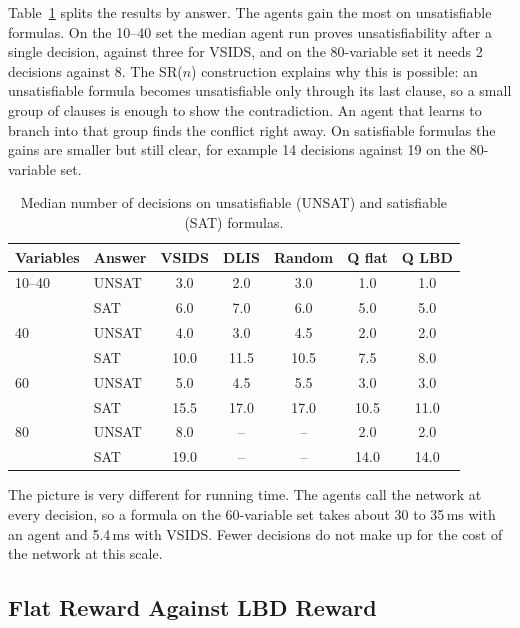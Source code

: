 \documentclass[11pt,a4paper]{article}
\begin{document}
Table~\ref{tab:sat_unsat} splits the results by answer. The agents gain the most on unsatisfiable formulas. On the 10--40 set the median agent run proves unsatisfiability after a single decision, against three for VSIDS, and on the 80-variable set it needs 2 decisions against 8. The SR($n$) construction explains why this is possible: an unsatisfiable formula becomes unsatisfiable only through its last clause, so a small group of clauses is enough to show the contradiction. An agent that learns to branch into that group finds the conflict right away. On satisfiable formulas the gains are smaller but still clear, for example 14 decisions against 19 on the 80-variable set.

\begin{table}[H]
    \centering
    \caption{Median number of decisions on unsatisfiable (UNSAT) and satisfiable (SAT) formulas.}
    \label{tab:sat_unsat}
    \begin{tabular}{llccccc}
        \toprule
        Variables & Answer & VSIDS & DLIS & Random & Q flat & Q LBD \\
        \midrule
        10--40 & UNSAT & 3.0 & 2.0 & 3.0 & 1.0 & 1.0 \\
               & SAT   & 6.0 & 7.0 & 6.0 & 5.0 & 5.0 \\
        40     & UNSAT & 4.0 & 3.0 & 4.5 & 2.0 & 2.0 \\
               & SAT   & 10.0 & 11.5 & 10.5 & 7.5 & 8.0 \\
        60     & UNSAT & 5.0 & 4.5 & 5.5 & 3.0 & 3.0 \\
               & SAT   & 15.5 & 17.0 & 17.0 & 10.5 & 11.0 \\
        80     & UNSAT & 8.0 & -- & -- & 2.0 & 2.0 \\
               & SAT   & 19.0 & -- & -- & 14.0 & 14.0 \\
        \bottomrule
    \end{tabular}
\end{table}

The picture is very different for running time. The agents call the network at every decision, so a formula on the 60-variable set takes about 30 to 35\,ms with an agent and 5.4\,ms with VSIDS. Fewer decisions do not make up for the cost of the network at this scale.

\subsection{Flat Reward Against LBD Reward}
\end{document}
